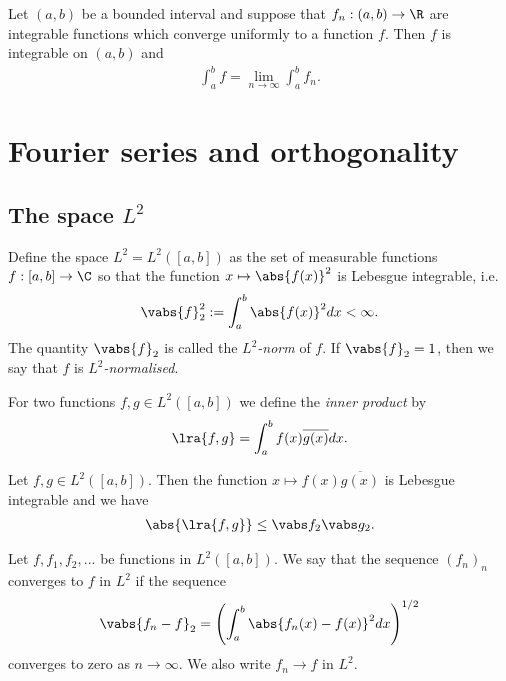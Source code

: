 \documentclass{article}
\begin{document}
\begin{theorem}[Notes 4.13]
    Let $(a,b)$ be a bounded interval and suppose that $f_n:(a,b)\to\R$ are integrable functions
    which converge uniformly to a function $f$. Then $f$ is integrable on $(a,b)$ and
    \begin{align*}
        \int_a^b f = \lim_{n\to\infty} \int_a^b f_n.
    \end{align*}
\end{theorem}

\section{Fourier series and orthogonality}

\subsection{The space $L^2$}

\begin{definition}[Notes 5.1]
    Define the space $L^2=L^2([a,b])$ as the set of measurable functions $f:[a,b]\to\C$
    so that the function $x\mapsto \abs{f(x)}^2$ is Lebesgue integrable, i.e.
    \begin{align*}
        \vabs{f}_2^2 := \int_a^b \abs{f(x)}^2 dx < \infty.
    \end{align*}
    The quantity $\vabs{f}_2$ is called the \emph{$L^2$-norm} of $f$. If $\vabs{f}_2=1$,
    then we say that $f$ is \emph{$L^2$-normalised}.
\end{definition}

\begin{definition}[Notes 5.2]
    For two functions $f,g\in L^2([a,b])$ we define the \emph{inner product} by
    \begin{align*}
        \lra{f,g} = \int_a^b f(x)\overline{g(x)}dx.
    \end{align*}
\end{definition}

\begin{theorem}
    Let $f,g\in L^2([a,b])$. Then the function $x\mapsto f(x)\overline{g(x)}$ is Lebesgue
    integrable and we have
    \begin{align*}
        \abs{\lra{f,g}}\leq \vabs f_2\vabs g_2.
    \end{align*}
\end{theorem}

\begin{definition}[Notes 5.3]
    Let $f,f_1,f_2,...$ be functions in $L^2([a,b])$. We say that the sequence $(f_n)_n$ converges
    to $f$ in $L^2$ if the sequence
    \begin{align*}
        \vabs{f_n - f}_2 = \left(\int_a^b \abs{f_n(x)-f(x)}^2dx\right)^{1/2}
    \end{align*}
    converges to zero as $n\to\infty$. We also write $f_n\to f$ in $L^2$.
\end{definition}
\end{document}
